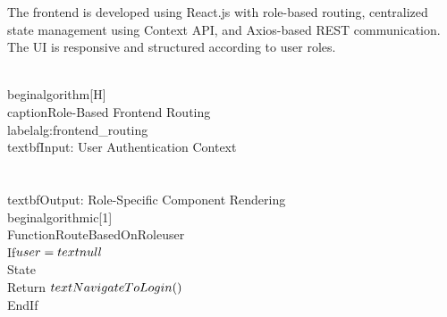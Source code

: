The frontend is developed using React.js with role-based routing, centralized state management using Context API, and Axios-based REST communication. The UI is responsive and structured according to user roles.

\\begin{algorithm}[H]
\\caption{Role-Based Frontend Routing}
\\label{alg:frontend_routing}
\\textbf{Input:} User Authentication Context\\\\
\\textbf{Output:} Role-Specific Component Rendering
\\begin{algorithmic}[1]
\\Function{RouteBasedOnRole}{user}
    \\If{$user = \\text{null}$}
        \\State \\Return $\\text{NavigateToLogin}()$
    \\EndIf
    

